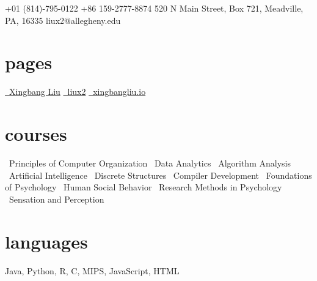 \documentclass[]{friggeri-cv}
\begin{document}
       {
       \faMobilePhone\hspace{1mm} +01 (814)-795-0122 \hspace{0.1cm} 			   \faMobilePhone\hspace{1mm} +86 159-2777-8874 \hspace{0.1cm}
       520 N Main Street, Box 721, Meadville, PA, 16335 \hspace{0.1cm} 					\faEnvelope\hspace{1.5mm}liux2@allegheny.edu
       }

\begin{aside}
  \section{pages}\vspace{0.05cm}
    \href{https://www.linkedin.com/in/liux2}{\faLinkedin\ Xingbang Liu}\vspace{0.03cm}
    \href{https://github.com/liux2}{\faGithub\ liux2}\vspace{0.03cm}
    \href{https://www.xingbangliu.io}{\faGlobe\ xingbangliu.io}\vspace{0.03cm}
  \section{courses}\vspace{0.05cm}
  \bullet\ Principles of Computer Organization\vspace{0.1cm}
  \bullet\ Data Analytics\vspace{0.1cm}
  \bullet\ Algorithm Analysis\vspace{0.1cm}
  \bullet\ Artificial Intelligence\vspace{0.1cm}
  \bullet\ Discrete Structures\vspace{0.1cm}
  \bullet\ Compiler Development\vspace{0.1cm}
  \bullet\ Foundations of Psychology\vspace{0.1cm}
  \bullet\ Human Social Behavior\vspace{0.1cm}
  \bullet\ Research Methods in Psychology\vspace{0.1cm}
  \bullet\ Sensation and Perception\vspace{0.1cm}
  \section{languages}\vspace{0.05cm}
    Java, Python, R, C, MIPS, JavaScript, HTML\vspace{0.1cm}

\end{aside}
\end{document}
